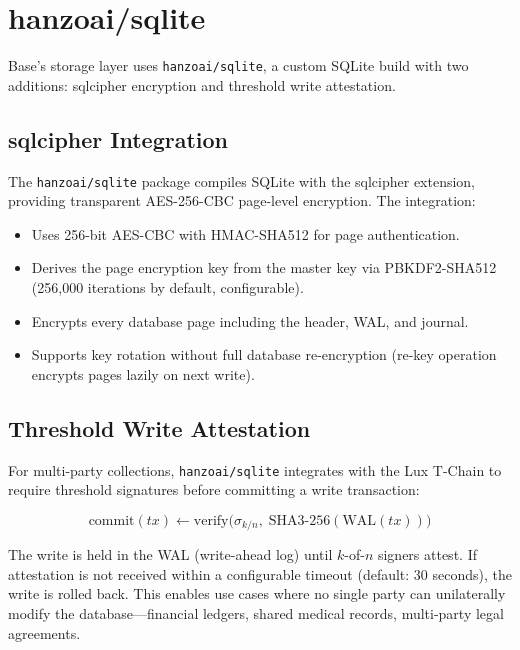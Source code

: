 \section{hanzoai/sqlite}

\label{sec:sqlite}

Base's storage layer uses \texttt{hanzoai/sqlite}, a custom SQLite build with
two additions: sqlcipher encryption and threshold write attestation.

\subsection{sqlcipher Integration}

The \texttt{hanzoai/sqlite} package compiles SQLite with the sqlcipher extension,
providing transparent AES-256-CBC page-level encryption. The integration:

\begin{itemize}[leftmargin=1.1em]
    \item Uses 256-bit AES-CBC with HMAC-SHA512 for page authentication.
    \item Derives the page encryption key from the master key via PBKDF2-SHA512
    (256,000 iterations by default, configurable).
    \item Encrypts every database page including the header, WAL, and journal.
    \item Supports key rotation without full database re-encryption (re-key
    operation encrypts pages lazily on next write).
\end{itemize}

\subsection{Threshold Write Attestation}

For multi-party collections, \texttt{hanzoai/sqlite} integrates with the Lux
T-Chain to require threshold signatures before committing a write transaction:

\begin{equation}
\text{commit}(tx) \leftarrow \text{verify}\bigl(\sigma_{k/n},\;
\text{SHA3-256}(\text{WAL}(tx))\bigr)
\end{equation}

The write is held in the WAL (write-ahead log) until $k$-of-$n$ signers
attest. If attestation is not received within a configurable timeout
(default: 30 seconds), the write is rolled back. This enables use cases where
no single party can unilaterally modify the database---financial ledgers,
shared medical records, multi-party legal agreements.

